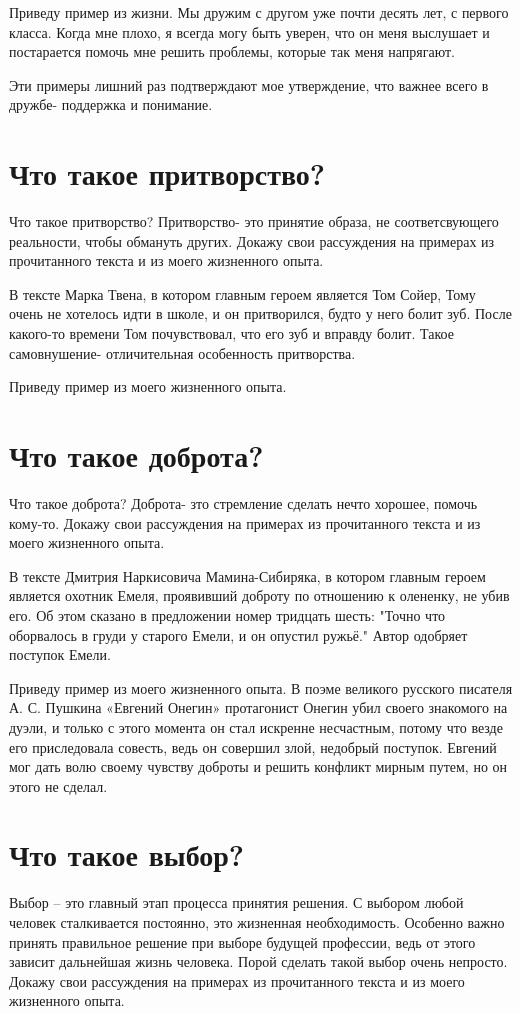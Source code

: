 \documentclass[12pt, letterpaper]{article}
\begin{document}
Приведу пример из жизни. Мы дружим с другом уже почти десять лет, с первого класса. Когда мне плохо, я всегда могу быть уверен, что он меня выслушает и постарается помочь мне решить проблемы, которые так меня напрягают.

Эти примеры лишний раз подтверждают мое утверждение,  что важнее всего в дружбе-  поддержка и понимание.

\section{Что такое притворство?}

Что такое притворство? Притворство- это принятие образа, не соответсвующего реальности, чтобы обмануть других. Докажу свои рассуждения на примерах из прочитанного текста и из моего жизненного опыта.

В тексте Марка Твена, в котором главным героем является Том Сойер, Тому очень не хотелось идти в школе, и он притворился, будто у него болит зуб. После какого-то времени Том почувствовал, что его зуб и вправду болит. Такое самовнушение- отличительная особенность притворства.

Приведу пример из моего жизненного опыта.

\section{Что такое доброта?}
Что такое доброта? Доброта- зто стремление сделать нечто хорошее, помочь кому-то. Докажу свои рассуждения на примерах из прочитанного текста и из моего жизненного опыта.

В тексте Дмитрия Наркисовича Мамина-Сибиряка, в котором главным героем является охотник Емеля, проявивший доброту по отношению к олененку, не убив его. Об этом сказано в предложении номер тридцать шесть: "Точно что оборвалось в груди у старого Емели, и он опустил ружьё." Автор одобряет поступок Емели.

Приведу пример из моего жизненного опыта. В поэме великого русского писателя А. С. Пушкина «Евгений Онегин» протагонист Онегин убил своего знакомого на дуэли, и только с этого момента он стал искренне несчастным, потому что везде его приследовала совесть, ведь он совершил злой, недобрый поступок. Евгений мог дать волю своему чувству доброты и решить конфликт мирным путем, но он этого не сделал.

\section{Что такое выбор?}
Выбор – это главный этап процесса принятия решения. С выбором любой человек сталкивается постоянно, это жизненная необходимость. Особенно важно принять правильное решение при выборе будущей профессии, ведь от этого зависит дальнейшая жизнь человека. Порой сделать такой выбор очень непросто. Докажу свои рассуждения на примерах из прочитанного текста и из моего жизненного опыта.
\end{document}
